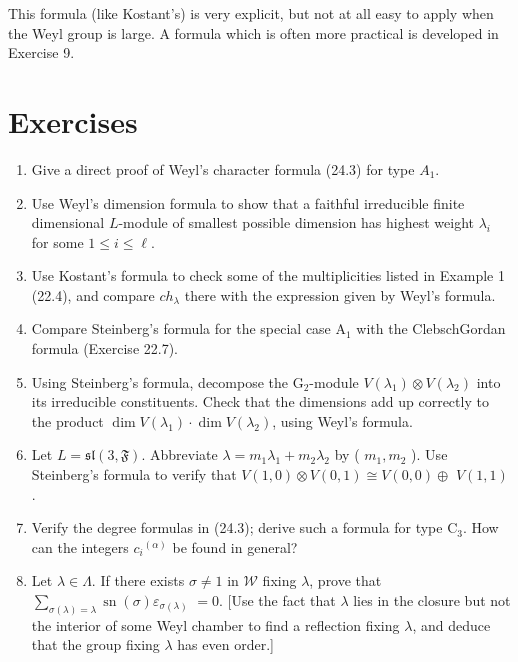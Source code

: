 \documentclass[10pt]{article}
\begin{document}
This formula (like Kostant's) is very explicit, but not at all easy to apply when the Weyl group is large. A formula which is often more practical is developed in Exercise 9.

\section*{Exercises}
\begin{enumerate}
  \item Give a direct proof of Weyl's character formula (24.3) for type $A_{1}$.
  \item Use Weyl's dimension formula to show that a faithful irreducible finite dimensional $L$-module of smallest possible dimension has highest weight $\lambda_{i}$ for some $1 \leq i \leq \ell$.
  \item Use Kostant's formula to check some of the multiplicities listed in Example 1 (22.4), and compare $c h_{\lambda}$ there with the expression given by Weyl's formula.
  \item Compare Steinberg's formula for the special case $\mathrm{A}_{1}$ with the ClebschGordan formula (Exercise 22.7).
  \item Using Steinberg's formula, decompose the $\mathrm{G}_{2}$-module $V\left(\lambda_{1}\right) \otimes V\left(\lambda_{2}\right)$ into its irreducible constituents. Check that the dimensions add up correctly to the product $\operatorname{dim} V\left(\lambda_{1}\right) \cdot \operatorname{dim} V\left(\lambda_{2}\right)$, using Weyl's formula.
  \item Let $L=\mathfrak{s l}(3, \mathfrak{F})$. Abbreviate $\lambda=m_{1} \lambda_{1}+m_{2} \lambda_{2}$ by ( $m_{1}, m_{2}$ ). Use Steinberg's formula to verify that $V(1,0) \otimes V(0,1) \cong V(0,0) \oplus$ $V(1,1)$.
  \item Verify the degree formulas in (24.3); derive such a formula for type $\mathrm{C}_{3}$. How can the integers $c_{i}{ }^{(\alpha)}$ be found in general?
  \item Let $\lambda \in \Lambda$. If there exists $\sigma \neq 1$ in $\mathscr{W}$ fixing $\lambda$, prove that $\sum_{\sigma(\lambda)=\lambda} \operatorname{sn}(\sigma) \varepsilon_{\sigma(\lambda)}$ $=0$. [Use the fact that $\lambda$ lies in the closure but not the interior of some Weyl chamber to find a reflection fixing $\lambda$, and deduce that the group fixing $\lambda$ has even order.]

\end{enumerate}
\end{document}
